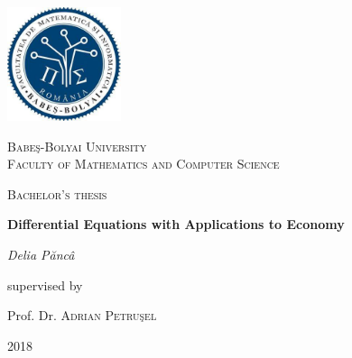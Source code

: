 \documentclass[a4paper, 11pt]{report}
\newcommand\blankpage{%
    \null
    \thispagestyle{empty}%
    \addtocounter{page}{-1}%
    \newpage}
\begin{document}
 \begin{titlepage}
	\centering
	\includegraphics[width=0.25\textwidth]{Facultate1.jpg}\par\vspace{1cm}
	{\scshape\LARGE Babe\c{s}-Bolyai University \\ Faculty of Mathematics and Computer Science \par}
	\vspace{1cm}
	{\scshape\Large Bachelor's thesis\par}
	\vspace{1.5cm}
	{\huge\bfseries Differential Equations with Applications to Economy\par}
	\vspace{2cm}
	{\Large\itshape Delia P\u{a}nc\^{a}\par}
	\vfill
	supervised by\par
	Prof. Dr.  \textsc{Adrian Petru\c{s}el}

	\vfill

	{2018}
\end{titlepage}
 \tableofcontents
 \blankpage
\end{document}
